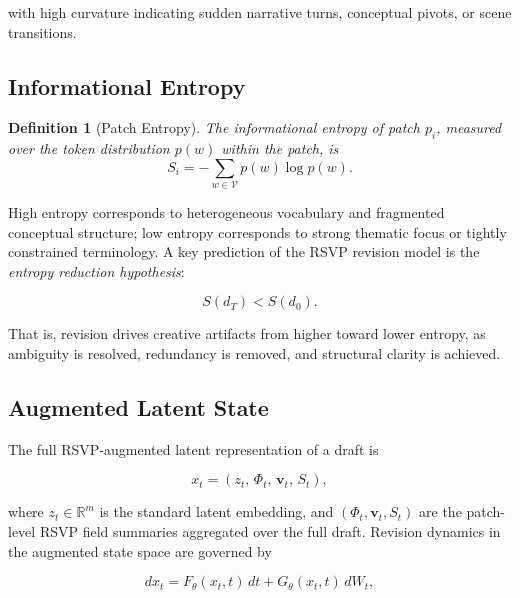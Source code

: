 \documentclass[12pt,a4paper]{article}
\theoremstyle{draftthm}
\newtheorem{definition}{Definition}[section]
\newcommand{\Lat}{\mathbb{R}^{m}}
\newcommand{\Ftheta}{F_{\theta}}
\newcommand{\Gtheta}{G_{\theta}}
\newcommand{\bW}{W}
\begin{document}
with high curvature indicating sudden narrative turns, conceptual pivots, or scene transitions.

\subsection{Informational Entropy}

\begin{definition}[Patch Entropy]
  The \emph{informational entropy} of patch $p_i$, measured over the token distribution $p(w)$ within the patch, is
  \begin{equation}
    S_i
    =
    - \sum_{w \in \mathcal{V}} p(w) \log p(w).
    \label{eq:patch-entropy}
  \end{equation}
\end{definition}

High entropy corresponds to heterogeneous vocabulary and fragmented conceptual structure; low entropy corresponds to strong thematic focus or tightly constrained terminology. A key prediction of the RSVP revision model is the \emph{entropy reduction hypothesis}:

\begin{equation}
  S(d_T) < S(d_0).
  \label{eq:entropy-reduction}
\end{equation}

That is, revision drives creative artifacts from higher toward lower entropy, as ambiguity is resolved, redundancy is removed, and structural clarity is achieved.

\subsection{Augmented Latent State}

The full RSVP-augmented latent representation of a draft is

\begin{equation}
  x_t = (z_t,\, \Phi_t,\, \mathbf{v}_t,\, S_t),
  \label{eq:augmented-state}
\end{equation}

where $z_t \in \Lat$ is the standard latent embedding, and $(\Phi_t, \mathbf{v}_t, S_t)$ are the patch-level RSVP field summaries aggregated over the full draft. Revision dynamics in the augmented state space are governed by

\begin{equation}
  dx_t = \Ftheta(x_t, t)\, dt + \Gtheta(x_t, t)\, d\bW_t,
  \label{eq:augmented-sde}
\end{equation}
\end{document}

